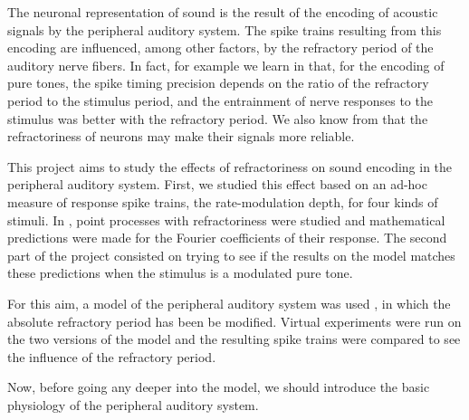 The neuronal representation of sound is the result of the encoding of acoustic 
signals by the peripheral auditory system. 
The spike trains resulting from this encoding are influenced, 
among other factors, by the refractory period of the auditory nerve fibers. 
In fact, for example we learn in \cite{AvissarPapier} that, for the encoding of pure tones, 
the spike timing precision depends on the ratio of  
the refractory period to the stimulus period, 
and the entrainment of nerve responses to the stimulus was better with the refractory period. 
We also know from \cite{BerryMeister} that the refractoriness of neurons may make their signals 
more reliable. 


This project aims to study the effects of  
refractoriness on sound encoding in the peripheral 
auditory system.  
First, we studied this effect based on an ad-hoc measure of response spike trains,  
the rate-modulation depth, for four kinds of stimuli.
In \cite{Deger}, point processes with refractoriness were studied and mathematical 
predictions were made for the Fourier coefficients of their response.
The second part of the project consisted on trying to see 
if the results on the model matches these predictions 
when the stimulus is a modulated pure tone.



For this aim, a model of the peripheral auditory system was used
\cite{Model1, Model2, Model3}, in which the absolute refractory period has been be modified. 
Virtual experiments were run on the two versions of the model and the resulting 
spike trains were compared to see the influence of the refractory period.
 
Now, before going any deeper into the model, we should introduce the basic 
physiology of the peripheral auditory system.



